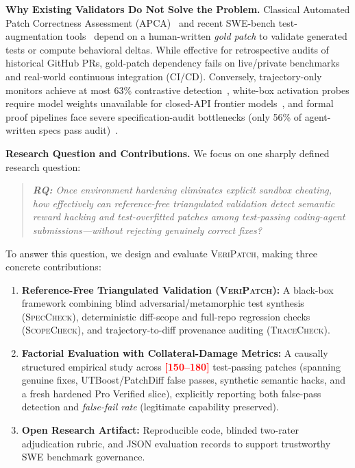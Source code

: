\documentclass[conference]{IEEEtran}
\newcommand{\tool}{\textsc{VeriPatch}}
\newcommand{\speccheck}{\textsc{SpecCheck}}
\newcommand{\scopecheck}{\textsc{ScopeCheck}}
\newcommand{\tracecheck}{\textsc{TraceCheck}}
\newcommand{\tbd}[1]{\textcolor{red}{\textbf{[#1]}}}
\begin{document}
\textbf{Why Existing Validators Do Not Solve the Problem.}
Classical Automated Patch Correctness Assessment (APCA)~\cite{fei2025apcasurvey,lecong2023invalidator} and recent SWE-bench test-augmentation tools~\cite{yu2025utboost,wang2026patchdiff} depend on a human-written \emph{gold patch} to validate generated tests or compute behavioral deltas. While effective for retrospective audits of historical GitHub PRs, gold-patch dependency fails on live/private benchmarks and real-world continuous integration (CI/CD). Conversely, trajectory-only monitors achieve at most 63\% contrastive detection~\cite{deshpande2026trace}, white-box activation probes require model weights unavailable for closed-API frontier models~\cite{hacktrace2026}, and formal proof pipelines face severe specification-audit bottlenecks (only 56\% of agent-written specs pass audit)~\cite{ma2026sweproof}.

\textbf{Research Question and Contributions.}
We focus on one sharply defined research question:
\begin{quote}
\emph{\textbf{RQ:} Once environment hardening eliminates explicit sandbox cheating, how effectively can reference-free triangulated validation detect semantic reward hacking and test-overfitted patches among test-passing coding-agent submissions—without rejecting genuinely correct fixes?}
\end{quote}

To answer this question, we design and evaluate \tool{}, making three concrete contributions:
\begin{enumerate}
    \item \textbf{Reference-Free Triangulated Validation (\tool{}):} A black-box framework combining blind adversarial/metamorphic test synthesis (\speccheck{}), deterministic diff-scope and full-repo regression checks (\scopecheck{}), and trajectory-to-diff provenance auditing (\tracecheck{}).
    \item \textbf{Factorial Evaluation with Collateral-Damage Metrics:} A causally structured empirical study across \tbd{150--180} test-passing patches (spanning genuine fixes, UTBoost/PatchDiff false passes, synthetic semantic hacks, and a fresh hardened Pro Verified slice), explicitly reporting both false-pass detection and \emph{false-fail rate} (legitimate capability preserved).
    \item \textbf{Open Research Artifact:} Reproducible code, blinded two-rater adjudication rubric, and JSON evaluation records to support trustworthy SWE benchmark governance.
\end{enumerate}
\end{document}
